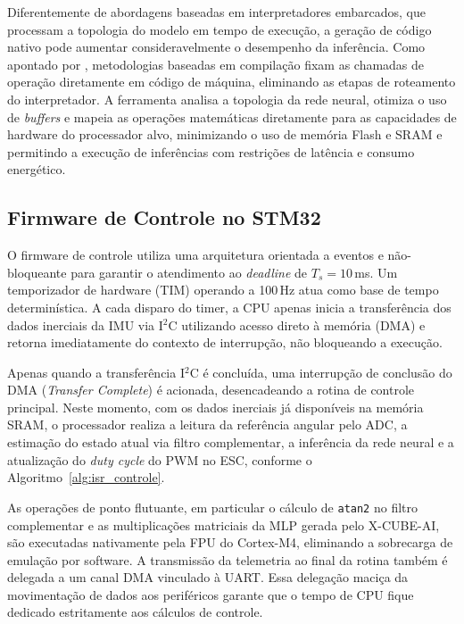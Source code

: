 Diferentemente de abordagens baseadas em interpretadores embarcados, que processam a topologia do modelo em tempo de execução, a geração de código nativo pode aumentar consideravelmente o desempenho da inferência. Como apontado por , metodologias baseadas em compilação fixam as chamadas de operação diretamente em código de máquina, eliminando as etapas de roteamento do interpretador. A ferramenta analisa a topologia da rede neural, otimiza o uso de \textit{buffers} e mapeia as operações matemáticas diretamente para as capacidades de hardware do processador alvo, minimizando o uso de memória Flash e SRAM e permitindo a execução de inferências com restrições de latência e consumo energético.

\subsection{Firmware de Controle no STM32}

O firmware de controle utiliza uma arquitetura orientada a eventos e não-bloqueante para garantir o atendimento ao \textit{deadline} de $T_s = 10$\,ms. Um temporizador de hardware (TIM) operando a 100\,Hz atua como base de tempo determinística. A cada disparo do timer, a CPU apenas inicia a transferência dos dados inerciais da IMU via I$^2$C utilizando acesso direto à memória (DMA) e retorna imediatamente do contexto de interrupção, não bloqueando a execução.

Apenas quando a transferência I$^2$C é concluída, uma interrupção de conclusão do DMA (\textit{Transfer Complete}) é acionada, desencadeando a rotina de controle principal. Neste momento, com os dados inerciais já disponíveis na memória SRAM, o processador realiza a leitura da referência angular pelo ADC, a estimação do estado atual via filtro complementar, a inferência da rede neural e a atualização do \textit{duty cycle} do PWM no ESC, conforme o Algoritmo~\ref{alg:isr_controle}.

As operações de ponto flutuante, em particular o cálculo de \texttt{atan2} no filtro complementar e as multiplicações matriciais da MLP gerada pelo X-CUBE-AI, são executadas nativamente pela FPU do Cortex-M4, eliminando a sobrecarga de emulação por software. A transmissão da telemetria ao final da rotina também é delegada a um canal DMA vinculado à UART. Essa delegação maciça da movimentação de dados aos periféricos garante que o tempo de CPU fique dedicado estritamente aos cálculos de controle.


